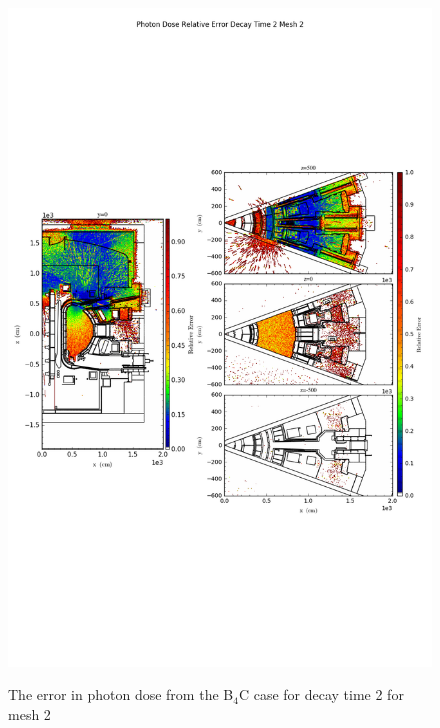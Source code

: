 \begin{figure}[ht!]
\centering
\includegraphics[trim={0cm 9cm 0cm 10cm},clip,scale=0.75]{../plots/final_model_with_b4c/Photon_Dose_Relative_Error_Decay_Time_2_Mesh_2.png}
\label{fig:photons_dc2_no4bc_m2_error}
\caption{The error in photon dose from the B$_4$C case for decay time 2 for mesh 2}
\end{figure}
